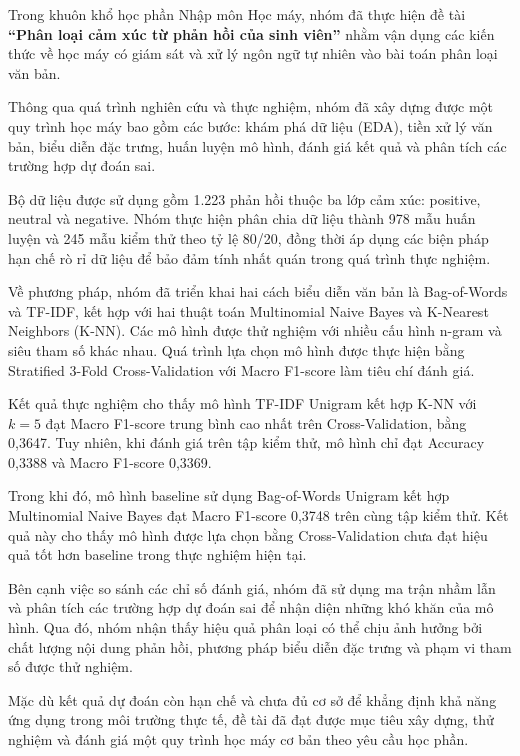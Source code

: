 

Trong khuôn khổ học phần Nhập môn Học máy,
nhóm đã thực hiện đề tài
\textbf{``Phân loại cảm xúc từ phản hồi của sinh viên''}
nhằm vận dụng các kiến thức về học máy có giám sát
và xử lý ngôn ngữ tự nhiên vào bài toán phân loại
văn bản.

Thông qua quá trình nghiên cứu và thực nghiệm,
nhóm đã xây dựng được một quy trình học máy
bao gồm các bước: khám phá dữ liệu (EDA),
tiền xử lý văn bản, biểu diễn đặc trưng,
huấn luyện mô hình, đánh giá kết quả và
phân tích các trường hợp dự đoán sai.

Bộ dữ liệu được sử dụng gồm 1.223 phản hồi
thuộc ba lớp cảm xúc: positive, neutral
và negative. Nhóm thực hiện phân chia dữ liệu
thành 978 mẫu huấn luyện và 245 mẫu kiểm thử
theo tỷ lệ 80/20, đồng thời áp dụng các
biện pháp hạn chế rò rỉ dữ liệu để bảo đảm
tính nhất quán trong quá trình thực nghiệm.

Về phương pháp, nhóm đã triển khai hai
cách biểu diễn văn bản là Bag-of-Words
và TF-IDF, kết hợp với hai thuật toán
Multinomial Naive Bayes và K-Nearest
Neighbors (K-NN). Các mô hình được
thử nghiệm với nhiều cấu hình n-gram
và siêu tham số khác nhau. Quá trình
lựa chọn mô hình được thực hiện bằng
Stratified 3-Fold Cross-Validation
với Macro F1-score làm tiêu chí đánh giá.

Kết quả thực nghiệm cho thấy mô hình
TF-IDF Unigram kết hợp K-NN với $k=5$
đạt Macro F1-score trung bình cao nhất
trên Cross-Validation, bằng 0,3647.
Tuy nhiên, khi đánh giá trên tập kiểm thử,
mô hình chỉ đạt Accuracy 0,3388 và
Macro F1-score 0,3369.

Trong khi đó, mô hình baseline sử dụng
Bag-of-Words Unigram kết hợp
Multinomial Naive Bayes đạt Macro
F1-score 0,3748 trên cùng tập kiểm thử.
Kết quả này cho thấy mô hình được lựa chọn
bằng Cross-Validation chưa đạt hiệu quả
tốt hơn baseline trong thực nghiệm hiện tại.

Bên cạnh việc so sánh các chỉ số đánh giá,
nhóm đã sử dụng ma trận nhầm lẫn và
phân tích các trường hợp dự đoán sai
để nhận diện những khó khăn của mô hình.
Qua đó, nhóm nhận thấy hiệu quả phân loại
có thể chịu ảnh hưởng bởi chất lượng nội dung
phản hồi, phương pháp biểu diễn đặc trưng
và phạm vi tham số được thử nghiệm.

Mặc dù kết quả dự đoán còn hạn chế và
chưa đủ cơ sở để khẳng định khả năng
ứng dụng trong môi trường thực tế,
đề tài đã đạt được mục tiêu xây dựng,
thử nghiệm và đánh giá một quy trình
học máy cơ bản theo yêu cầu học phần.

